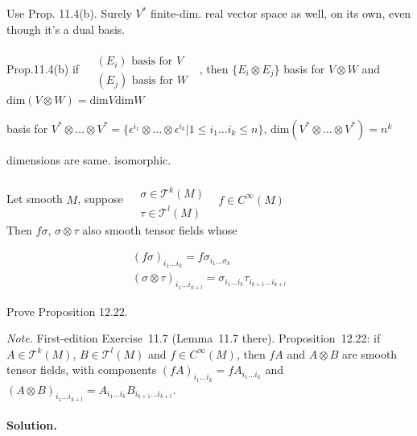 Use Prop. 11.4(b).  Surely $V^*$ finite-dim. real vector space as well, on its own, even though it's a dual basis. 

Prop.11.4(b) if $\begin{aligned} & \quad \\ 
& (E_i) \text{ basis for $V$ } \\ 
  & (E_j) \text{ basis for $W$ } \end{aligned}$, \quad then $\lbrace E_i \otimes E_j \rbrace$ basis for $V\otimes W$ and $\text{dim}{ (V\otimes W)} = \text{dim}{V} \text{dim}{W}$

basis for $V^* \otimes \dots \otimes V^* = \lbrace \epsilon^{i_1} \otimes \dots \otimes \epsilon^{i_k} | 1 \leq i_1 \dots i_k \leq n \rbrace$, \quad $\text{dim}{ (V^* \otimes \dots \otimes V^*) } = n^k$

dimensions are same.  isomorphic.  






\begin{lemma}[11.7] Let smooth $M$, suppose $\begin{aligned} & \quad \\ & \sigma \in \mathcal{T}^k(M) \\ & \tau \in \mathcal{T}^l(M) \end{aligned}$ \quad \, $f\in C^{\infty}(M)$  \\

Then $f\sigma$, $\sigma \otimes \tau$ also smooth tensor fields whose 

\[
\begin{gathered}
  (f\sigma)_{i_1 \dots i_k} = f \sigma_{i_1 \dots \sigma_k } \\ 
  (\sigma \otimes \tau)_{i_1 \dots i_{k+l} } = \sigma_{i_1 \dots i_k} \tau_{i_{k+1} \dots i_{k+l} }
\end{gathered}
\]
\end{lemma}

\begin{exercise}
Prove Proposition 12.22.
\end{exercise}
\noindent\emph{Note.} First-edition Exercise~11.7 (Lemma~11.7 there). Proposition~12.22: if $A\in\mathcal{T}^k(M)$, $B\in\mathcal{T}^l(M)$ and $f\in C^\infty(M)$, then $fA$ and $A\otimes B$ are smooth tensor fields, with components $(fA)_{i_1\ldots i_k}=fA_{i_1\ldots i_k}$ and $(A\otimes B)_{i_1\ldots i_{k+l}}=A_{i_1\ldots i_k}B_{i_{k+1}\ldots i_{k+l}}$.
\paragraph{Solution.}

